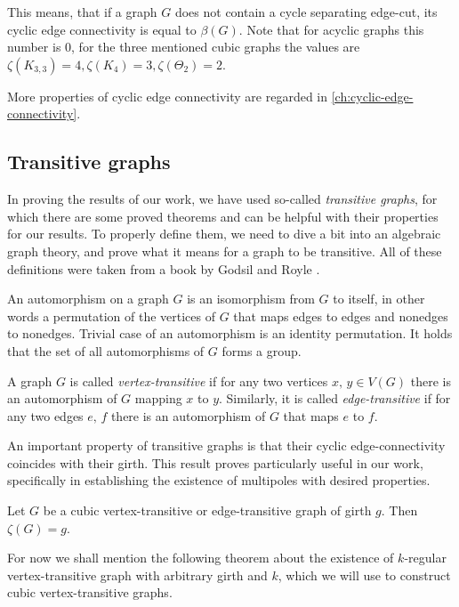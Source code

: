 \documentclass[12pt, twoside]{book}
\begin{document}
This means, that if a graph $G$ does not contain a cycle separating edge-cut, its cyclic edge connectivity is equal to $\beta(G)$. Note that for acyclic graphs this number is 0, for the three mentioned cubic graphs the values are $\zeta(K_{3,3})=4, \zeta(K_4)=3, \zeta(\Theta_2)=2$.

More properties of cyclic edge connectivity are regarded in \cref{ch:cyclic-edge-connectivity}.

\subsection{Transitive graphs}

In proving the results of our work, we have used so-called \textit{transitive graphs}, for which there are some proved theorems and can be helpful with their properties for our results. To properly define them, we need to dive a bit into an algebraic graph theory, and prove what it means for a graph to be transitive. All of these definitions were taken from a book by Godsil and Royle \cite{algebraic-graph-theory}.

An automorphism on a graph $G$ is an isomorphism from $G$ to itself, in other words a permutation of the vertices of $G$ that maps edges to edges and nonedges to nonedges. Trivial case of an automorphism is an identity permutation. It holds that the set of all automorphisms of $G$ forms a group.

A graph $G$ is called \emph{vertex-transitive} if for any two vertices $x,\,y\in V(G)$ there is an automorphism of $G$ mapping $x$ to $y$. Similarly, it is called \emph{edge-transitive} if for any two edges $e,\,f$ there is an automorphism of $G$ that maps $e$ to $f$.

An important property of transitive graphs is that their cyclic edge-connectivity coincides with their girth. This result proves particularly useful in our work, specifically in establishing the existence of multipoles with desired properties.

\begin{theorem}\label{th:cyclic-connectivity-of-transitive}
	Let $G$ be a cubic \mbox{vertex-transitive} or \mbox{edge-transitive} graph of girth $g$. Then $\zeta(G) = g$.
\end{theorem}

For now we shall mention the following theorem about the existence of $k$-regular vertex-transitive graph with arbitrary girth and $k$, which we will use to construct cubic vertex-transitive graphs.
\end{document}
